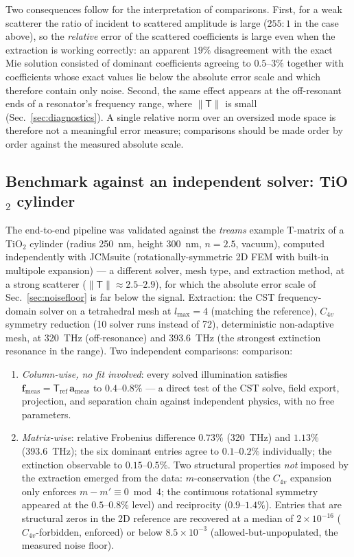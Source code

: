 \documentclass[11pt]{article}
\begin{document}
Two consequences follow for the interpretation of comparisons.
First, for a weak scatterer the ratio of incident to scattered
amplitude is large ($255{:}1$ in the case above), so the \emph{relative}
error of the scattered coefficients is large even when the extraction
is working correctly: an apparent $19\%$ disagreement with the exact
Mie solution consisted of dominant coefficients agreeing to
$0.5$--$3\%$ together with coefficients whose exact values lie below
the absolute error scale and which therefore contain only noise.
Second, the same effect appears at the off-resonant ends of a
resonator's frequency range, where $\|\mathsf{T}\|$ is small
(Sec.~\ref{sec:diagnostics}).  A single relative norm over an
oversized mode space is therefore not a meaningful error measure;
comparisons should be made order by order against the measured
absolute scale.

\subsection{Benchmark against an independent solver: TiO$_2$ cylinder}
\label{sec:cylinderbench}
The end-to-end pipeline was validated against the \emph{treams}
example T-matrix of a TiO$_2$ cylinder (radius 250~nm, height 300~nm,
$n = 2.5$, vacuum), computed independently with JCMsuite
(rotationally-symmetric 2D FEM with built-in multipole expansion) ---
a different solver, mesh type, and extraction method, at a strong
scatterer ($\|\mathsf{T}\| \approx 2.5$--$2.9$), for which the absolute
error scale of Sec.~\ref{sec:noisefloor} is far below the signal.
Extraction: the CST frequency-domain solver on a tetrahedral mesh at
$l_{\max} = 4$ (matching the reference), $C_{4v}$
symmetry reduction (10 solver runs instead of 72), deterministic
non-adaptive mesh, at 320~THz (off-resonance) and 393.6~THz (the
strongest extinction resonance in the range).  Two independent comparisons:
comparison:
\begin{enumerate}
\item \emph{Column-wise, no fit involved}: every solved illumination
satisfies $\mathbf{f}_{\mathrm{meas}} =
\mathsf{T}_{\mathrm{ref}}\,\mathbf{a}_{\mathrm{meas}}$ to
$0.4$--$0.8\%$ --- a direct test of the CST solve, field export,
projection, and separation chain against independent physics, with no
free parameters.
\item \emph{Matrix-wise}: relative Frobenius difference $0.73\%$
(320~THz) and $1.13\%$ (393.6~THz); the six dominant entries agree to
$0.1$--$0.2\%$ individually; the extinction observable to
$0.15$--$0.5\%$.  Two structural properties \emph{not} imposed by the
extraction emerged from the data: $m$-conservation (the $C_{4v}$
expansion only enforces $m - m' \equiv 0 \bmod 4$; the continuous
rotational symmetry appeared at the $0.5$--$0.8\%$ level) and
reciprocity ($0.9$--$1.4\%$).  Entries that are structural zeros in the
2D reference are recovered at a median of $2\times 10^{-16}$
($C_{4v}$-forbidden, enforced) or below $8.5\times 10^{-3}$
(allowed-but-unpopulated, the measured noise floor).
\end{enumerate}
\end{document}

